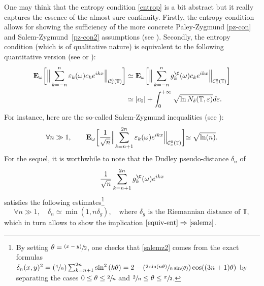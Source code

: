\documentclass[10pt]{amsart}
\newcommand{\Psfrac}[2]{(\sfrac{#1}{#2})}
\newcommand{\psfrac}[2]{\sfrac{(#1)}{#2}}
\theoremstyle{theorem}
\theoremstyle{definition}
\newcommand\E{\mathbf{E}}
\newcommand\CC{\mathcal{C}}
\newcommand\T{\mathbb{T}}
\newcommand\ep{\varepsilon}
\begin{document}
One may think that the entropy condition \eqref{entrop} is a bit abstract but it really captures the essence of the almost sure continuity.
Firstly, the entropy condition allows for showing the sufficiency of the more concrete Paley-Zygmund \eqref{pz-con} and Salem-Zygmund~\eqref{pz-con2} assumptions (see \cite[Part VII.1]{pisier1981}).
Secondly, the entropy condition (which is of qualitative nature) is equivalent to the following quantitative version (see \cite[p.\,11]{pisier1981} or \cite[p.\,3--4]{pisier1977}):\vspace*{-3pt}
\begin{equation}\label{equiv-ent}
\begin{aligned}
\E_\omega\biggl[\Big\|\sum_{k=-n}^n \ep_k(\omega) c_k e^{ikx} \Big\|_{\CC_x^0(\mathcal{\mathbb{T}})}\biggr] & \simeq \E_\omega\biggl[\Big\|\sum_{k=-n}^n g_k^{\C}(\omega) c_k e^{ikx} \Big\|_{\CC_x^0(\mathcal{\mathbb{T}})}\biggr]\\ 
& \simeq |c_0|+\int_{0}^{+\infty} \sqrt{\ln N_{\delta}(\T,\ep)} d\ep.
\end{aligned}
\end{equation}
For instance, here are the so-called Salem-Zygmund inequalities (see \cite[p.\,259]{queff2}):\vspace*{-3pt}
\begin{equation}\label{salemz}
\forall n\gg 1, \qquad \E_{\omega}\biggl[\frac{1}{\sqrt{n}}\Bigl\Vert \sum_{k=n+1}^{2n}\ep_k(\omega) e^{ikx} \Bigr\Vert_{\CC_x^0(\mathbb{T})} \biggl]\simeq \sqrt{\ln(n)}.
\end{equation}
For the sequel, it is worthwhile to note that the Dudley pseudo-distance $\delta_n$ of\vspace*{-3pt}
\begin{equation*}
\frac{1}{\sqrt{n}}\sum_{k=n+1}^{2n}g_k^{\C}(\omega) e^{ikx}
\end{equation*} satisfies the following estimates\footnote{
By setting $\theta=\psfrac{x-y}{2}$, one checks that \eqref{salemz2} comes from the exact formulas $\delta_n(x,y)^2 = \Psfrac{4}{n}\sum_{k=n+1}^{2n} \sin^2\left(k\theta\right)=2-\Psfrac{2\sin(n\theta)}{n\sin(\theta)}\cos((3n+1)\theta)$ by separating the cases $0\leq \theta\leq \sfrac{2}{n}$ and $\sfrac{2}{n}\leq \theta\leq \sfrac{\pi}{2}$.}
\begin{equation}\label{salemz2}
\forall n\gg1, \quad \delta_n\simeq \min(1,n\delta_{g}), \quad \text{where $\delta_{g}$ is the Riemannian distance of }\mathbb{T},
\end{equation}
which in turn allows to show the implication $\eqref{equiv-ent}\Rightarrow\eqref{salemz}$.
\end{document}
